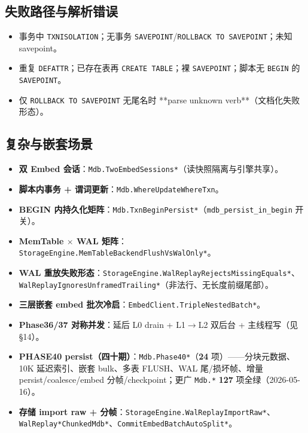 \subsection{失败路径与解析错误}

\begin{itemize}
  \item 事务中 \texttt{TXNISOLATION}；无事务 \texttt{SAVEPOINT}/\texttt{ROLLBACK TO SAVEPOINT}；未知 savepoint。
  \item 重复 \texttt{DEFATTR}；已存在表再 \texttt{CREATE TABLE}；裸 \texttt{SAVEPOINT}；脚本无 \texttt{BEGIN} 的 \texttt{SAVEPOINT}。
  \item 仅 \texttt{ROLLBACK TO SAVEPOINT} 无尾名时 **parse unknown verb**（文档化失败形态）。
\end{itemize}

\subsection{复杂与嵌套场景}

\begin{itemize}
  \item \textbf{双 Embed 会话}：\texttt{Mdb.TwoEmbedSessions*}（读快照隔离与引擎共享）。
  \item \textbf{脚本内事务 + 谓词更新}：\texttt{Mdb.WhereUpdateWhereTxn}。
  \item \textbf{BEGIN 内持久化矩阵}：\texttt{Mdb.TxnBeginPersist*}（\texttt{mdb\_persist\_in\_begin} 开关）。
  \item \textbf{MemTable $\times$ WAL 矩阵}：\texttt{StorageEngine.MemTableBackendFlushVsWalOnly*}。
  \item \textbf{WAL 重放失败形态}：\texttt{StorageEngine.WalReplayRejectsMissingEquals*}、\texttt{WalReplayIgnoresUnframedTrailing*}（非法行、无长度前缀尾部）。
  \item \textbf{三层嵌套 embed 批次冷启}：\texttt{EmbedClient.TripleNestedBatch*}。
  \item \textbf{Phase36/37 对称并发}：延后 L0 drain + L1$\rightarrow$L2 双后台 + 主线程写（见  \S14）。
  \item \textbf{PHASE40 persist（四十期）}：\texttt{Mdb.Phase40*}（\textbf{24} 项）——分块元数据、10K 延迟索引、嵌套 bulk、多表 FLUSH、WAL 尾/损坏帧、增量 persist/coalesce/embed 分帧/checkpoint；更广 \texttt{Mdb.*} \textbf{127} 项全绿（2026-05-16）。
  \item \textbf{存储 import raw + 分帧}：\texttt{StorageEngine.WalReplayImportRaw*}、\texttt{WalReplay*ChunkedMdb*}、\texttt{CommitEmbedBatchAutoSplit*}。
\end{itemize}

